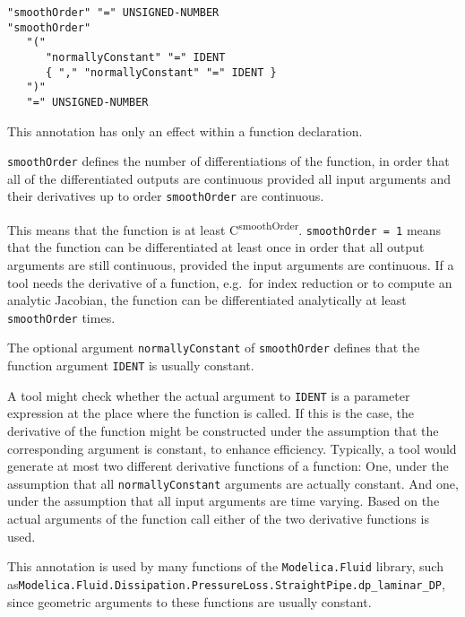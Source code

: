 \begin{annotationdefinition}[smoothOrder]
\begin{synopsis}[grammar]\begin{lstlisting}
"smoothOrder" "=" UNSIGNED-NUMBER
"smoothOrder"
   "("
      "normallyConstant" "=" IDENT
      { "," "normallyConstant" "=" IDENT }
   ")"
   "=" UNSIGNED-NUMBER
\end{lstlisting}\end{synopsis}
\begin{semantics}
This annotation has only an effect within a function declaration.

\lstinline!smoothOrder! defines the number of differentiations of the function, in order that all of the differentiated outputs are continuous provided all input arguments and their derivatives up to order \lstinline!smoothOrder! are continuous.

\begin{nonnormative}
This means that the function is at least C\textsuperscript{smoothOrder}.
\lstinline!smoothOrder = 1! means that the function can be differentiated at least once in order that all output arguments are still continuous, provided the input arguments are continuous.
If a tool needs the derivative of a function, e.g.\ for index reduction or to compute an analytic Jacobian, the function can be differentiated analytically at least \lstinline!smoothOrder! times.
\end{nonnormative}

The optional argument \lstinline!normallyConstant! of \lstinline!smoothOrder! defines that the function argument \lstinline!IDENT! is usually constant.

\begin{nonnormative}
A tool might check whether the actual argument to \lstinline!IDENT! is a parameter expression at the place where the function is called.
If this is the case, the derivative of the function might be constructed under the assumption that the corresponding argument is constant, to enhance efficiency.
Typically, a tool would generate at most two different derivative functions of a function:
One, under the assumption that all \lstinline!normallyConstant! arguments are actually constant.
And one, under the assumption that all input arguments are time varying.
Based on the actual arguments of the function call either of the two derivative functions is used.

This annotation is used by many functions of the \lstinline!Modelica.Fluid! library, such as\linebreak[4] \lstinline!Modelica.Fluid.Dissipation.PressureLoss.StraightPipe.dp_laminar_DP!, since geometric arguments to these functions are usually constant.
\end{nonnormative}
\end{semantics}
\end{annotationdefinition}

